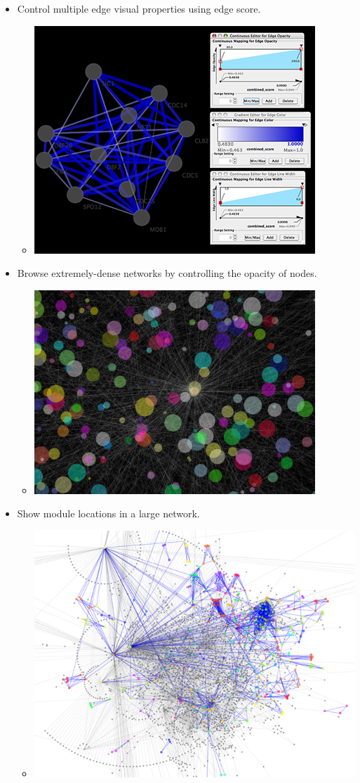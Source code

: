 \begin{itemize}
\begin{itemize}
\end{itemize}

\item Control multiple edge visual properties using edge score. \begin{itemize}
\item 

 \includegraphics[width=.6\textwidth]{images/MultipleEdgeMapping.png} 


\end{itemize}

\item Browse extremely-dense networks by controlling the opacity of nodes. \begin{itemize}
\item 

 \includegraphics[width=.6\textwidth]{images/OpacityForNodesAndEdges.png} 


\end{itemize}

\item Show module locations in a large network. \begin{itemize}
\item 

 \includegraphics[width=.6\textwidth]{images/ModuleLocations.png} 



\end{itemize}
\end{itemize}
